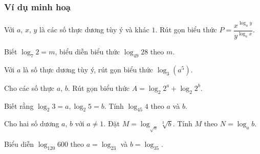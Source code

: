 \subsubsection{Ví dụ minh hoạ}
\begin{vd}
	Với $a$, $x$, $y$ là các số thực dương tùy ý và khác $1$. Rút gọn biểu thức $P=\dfrac{x^{\log _{a} y}}{y^{\log _{a} x}}$.
\end{vd}
\begin{vd} 
	Biết $\log _{7} 2=m$, biểu diễn biểu thức $\log _{49} 28$ theo $m$.	
\end{vd}
\begin{vd}
	Với $ a $ là số thực dương tùy ý, rút gọn biểu thức $\log_{3}\left(a^5\right)$.
\end{vd}
\begin{vd} 
	Cho các số thực $ a $, $ b $. Rút gọn biểu thức $ A=\log_2 2^a+\log_2 2^b $.	
\end{vd}
\begin{vd}
	Biết rằng $\log _2 3=a, \log _2 5=b$. Tính $\log _{45} 4$ theo $a$ và $b$.
\end{vd}
\begin{vd}
	Cho hai số dương $a$, $b$ với $a\ne 1$. Đặt $M=\log_{\sqrt{a}}\sqrt[3]{b}$. Tính $M$ theo $N=\log_ab$.
\end{vd}
\begin{vd}
	Biểu diễn $\log_{120}600$ theo $a=\log_23$ và $b=\log_35$.
\end{vd}

